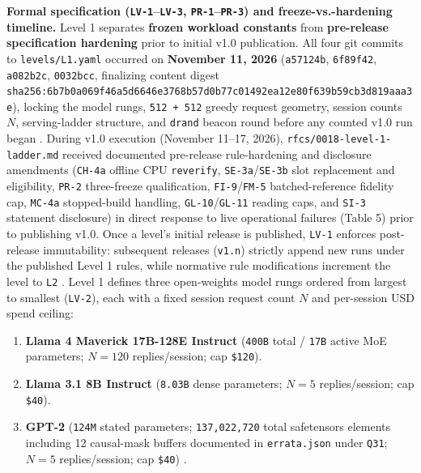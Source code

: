 \documentclass[11pt,letterpaper]{article}
\begin{document}
\textbf{Formal specification (\texttt{LV-1}--\texttt{LV-3}, \texttt{PR-1}--\texttt{PR-3}) and freeze-vs.-hardening timeline.} Level 1 separates \textbf{frozen workload constants} from \textbf{pre-release specification hardening} prior to initial v1.0 publication. All four git commits to \texttt{levels/\allowbreak{}L1.\allowbreak{}yaml} occurred on \textbf{November 11, 2026} (\texttt{a57124b}, \texttt{6f89f42}, \texttt{a082b2c}, \texttt{0032bcc}, finalizing content digest \texttt{sha256:\allowbreak{}6b7b0a06\allowbreak{}9f46a5d6\allowbreak{}646e3768\allowbreak{}b57d0b77\allowbreak{}c01492ea\allowbreak{}12e80f63\allowbreak{}9b59cb3d\allowbreak{}819aaa3e}), locking the model rungs, \texttt{512 + 512} greedy request geometry, session counts $N$, serving-ladder structure, and \texttt{drand} beacon round before any counted v1.0 run began \cite{iproofs2026}. During v1.0 execution (November 11--17, 2026), \texttt{rfcs/\allowbreak{}0018-\allowbreak{}level-1-\allowbreak{}ladder.\allowbreak{}md} received documented pre-release rule-hardening and disclosure amendments (\texttt{CH-4a} offline CPU \texttt{reverify}, \texttt{SE-3a}/\texttt{SE-3b} slot replacement and eligibility, \texttt{PR-2} three-freeze qualification, \texttt{FI-9}/\texttt{FM-5} batched-reference fidelity cap, \texttt{MC-4a} stopped-build handling, \texttt{GL-10}/\texttt{GL-11} reading caps, and \texttt{SI-3} statement disclosure) in direct response to live operational failures (Table 5) prior to publishing v1.0. Once a level's initial release is published, \texttt{LV-1} enforces post-release immutability: subsequent releases (\texttt{v1.\allowbreak{}n}) strictly append new runs under the published Level 1 rules, while normative rule modifications increment the level to \texttt{L2} \cite{iproofs2026}. Level 1 defines three open-weights model rungs ordered from largest to smallest (\texttt{LV-2}), each with a fixed session request count $N$ and per-session USD spend ceiling:

\begin{enumerate}
\item \textbf{Llama 4 Maverick 17B-128E Instruct} (\texttt{400B} total / \texttt{17B} active MoE parameters; $N = 120$ replies/session; cap \texttt{\$120}).
\item \textbf{Llama 3.1 8B Instruct} (\texttt{8.03B} dense parameters; $N = 5$ replies/session; cap \texttt{\$40}).
\item \textbf{GPT-2} (\texttt{124M} stated parameters; \texttt{137,022,720} total safetensors elements including 12 causal-mask buffers documented in \texttt{errata.\allowbreak{}json} under \texttt{Q31}; $N = 5$ replies/session; cap \texttt{\$40}) \cite{iproofs2026}.
\end{enumerate}
\end{document}
